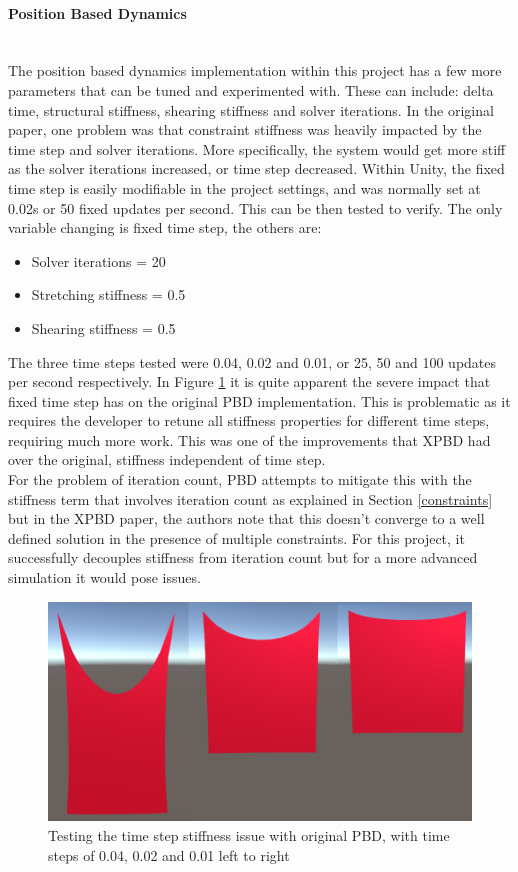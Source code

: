 \documentclass[12pt,a4paper]{article}
\begin{document}
\paragraph{Position Based Dynamics} \mbox{} \\
The position based dynamics implementation within this project has a few more parameters that can be tuned and experimented with. These can include: delta time, structural stiffness, shearing stiffness and solver iterations. In the original paper, one problem was that constraint stiffness was heavily impacted by the time step and solver iterations. More specifically, the system would get more stiff as the solver iterations increased, or time step decreased. Within Unity, the fixed time step is easily modifiable in the project settings, and was normally set at 0.02s or 50 fixed updates per second. This can be then tested to verify. The only variable changing is fixed time step, the others are: 
\begin{itemize}
	\item Solver iterations = 20
	\item Stretching stiffness = 0.5
	\item Shearing stiffness = 0.5
\end{itemize}

The three time steps tested were 0.04, 0.02 and 0.01, or 25, 50 and 100 updates per second respectively. In Figure \ref{fig:pbdts} it is quite apparent the severe impact that fixed time step has on the original PBD implementation. This is problematic as it requires the developer to retune all stiffness properties for different time steps, requiring much more work. This was one of the improvements that XPBD had over the original, stiffness independent of time step. \\

For the problem of iteration count, PBD attempts to mitigate this with the stiffness term that involves iteration count as explained in Section \ref{constraints} but in the XPBD paper, the authors note that this doesn't converge to a well defined solution in the presence of multiple constraints. For this project, it successfully decouples stiffness from iteration count but for a more advanced simulation it would pose issues. \\
\begin{figure}
	\centering
	\includegraphics[scale=0.5]{pbdtscomp.png}
	\caption{Testing the time step stiffness issue with original PBD, with time steps of 0.04, 0.02 and 0.01 left to right}
	\label{fig:pbdts}
\end{figure}
\end{document}
